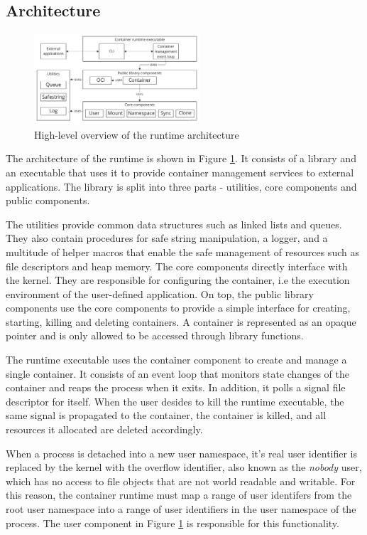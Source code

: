 \subsection{Architecture}
\begin{figure}[H]
    \centering
    \includegraphics[width=0.55\textwidth]{images/concept/runtime-arch-overview.jpg}
    \caption{High-level overview of the runtime architecture}
    \label{images:concept/runtime-arch-overview.jpg}
\end{figure}
The architecture of the runtime is shown in Figure \ref{images:concept/runtime-arch-overview.jpg}.
It consists of a library and an executable that uses it to provide container 
management services to external applications. The library is split into three parts - utilities,
core components and public components. 

The utilities provide common data structures such as 
linked lists and queues. They also contain procedures for safe string manipulation, a logger,
and a multitude of helper macros that enable the safe management of resources such as file descriptors 
and heap memory. The core components directly interface with the kernel. 
They are responsible for configuring the container, 
i.e the execution environment of the user-defined application. On top, the public library 
components use the core components to provide a 
simple interface for creating, starting, killing and deleting containers. A container 
is represented as an opaque pointer and is only allowed to be accessed through library functions.

The runtime executable uses the container component to create and manage a single container.
It consists of an event loop that monitors state changes of the container and reaps the process 
when it exits. In addition, it polls a signal file descriptor for itself. When the user desides 
to kill the runtime executable, the same signal is propagated to the container, the container 
is killed, and all resources it allocated are deleted accordingly. 

When a process is detached into a new user namespace, it's real user identifier is replaced by the kernel 
with the overflow identifier, also known as the \textit{nobody} user, which has no access to 
file objects that are not world readable and writable. 
For this reason, the container runtime must map a range of user identifers from the root user namespace 
into a range of user identifiers in the user namespace of the process. The user component in Figure 
\ref{images:concept/runtime-arch-overview.jpg} is responsible for this functionality. 

